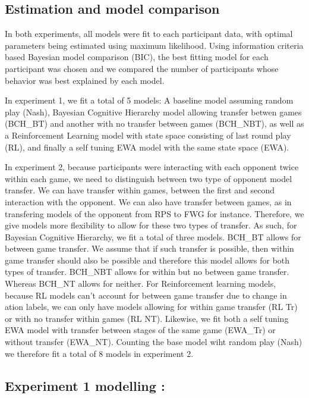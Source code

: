 \documentclass[man,floatsintext]{apa6}
\begin{document}
\hypertarget{estimation-and-model-comparison}{%
\subsection{Estimation and model comparison}\label{estimation-and-model-comparison}}

In both experiments, all models were fit to each participant data, with optimal parameters being estimated using maximum likelihood. Using information criteria based Bayesian model comparison (BIC), the best fitting model for each participant was chosen and we compared the number of participants whose behavior was best explained by each model.

In experiment 1, we fit a total of 5 models: A baseline model assuming random play (Nash), Bayesian Cognitive Hierarchy model allowing transfer betwen games (BCH\_BT) and another with no transfer between games (BCH\_NBT), as well as a Reinforcement Learning model with state space consisting of last round play (RL), and finally a self tuning EWA model with the same state space (EWA).

In experiment 2, because participants were interacting with each opponent twice within each game, we need to distinguish between two type of opponent model transfer. We can have transfer within games, between the first and second interaction with the opponent. We can also have transfer between games, as in transfering models of the opponent from RPS to FWG for instance. Therefore, we
give models more flexibility to allow for these two types of transfer. As such, for Bayesian Cognitive Hierarchy, we fit a total of three models. BCH\_BT allows for between game transfer. We assume that if such transfer is possible, then within game transfer should also be possible and therefore this model allows for both types of transfer. BCH\_NBT allows for within but no between game transfer. Whereas BCH\_NT allows for neither. For Reinforcement learning models, because RL models can't account for between game transfer due to change in ation labels, we can only have models allowing for within game transfer (RL Tr) or with no transfer within games (RL NT). Likewise, we fit both a self tuning EWA model with transfer between stages of the same game (EWA\_Tr) or without transfer (EWA\_NT). Counting the base model wiht random play (Nash) we therefore fit a total of 8 models in experiment 2.

\hypertarget{experiment-1-modelling}{%
\subsection{Experiment 1 modelling :}\label{experiment-1-modelling}}
\end{document}
